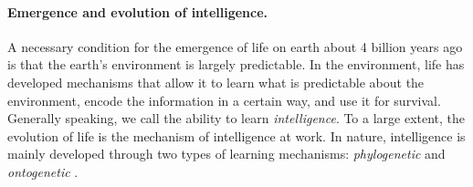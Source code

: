 \documentclass[\toplevelprefix/book-main.tex]{subfiles}
\begin{document}
\paragraph{Emergence and evolution of intelligence.}

A necessary condition for the emergence of life on earth about 4 billion years ago is that the earth's environment is largely predictable. In the environment, life has developed mechanisms that allow it to learn what is predictable about the environment, encode the information in a certain way, and use it for survival. Generally speaking, we call the ability to learn {\em intelligence}. To a large extent, the evolution of life is the mechanism of intelligence at work. In nature, intelligence is mainly developed through two types of learning mechanisms: {\em phylogenetic} and {\em ontogenetic} \cite{Wiener-Cybernetics-1961}.%
\end{document}
